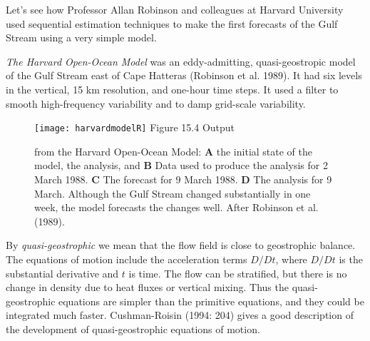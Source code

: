 Let's see how Professor Allan Robinson and colleagues at Harvard
University used sequential estimation techniques to make the first forecasts of the Gulf
Stream using a very simple model.

\textit{The Harvard Open-Ocean Model} was an eddy-admitting,
quasi-geostrop\-ic mod\-el of the Gulf Stream east of Cape Hatteras (Robinson et al. 1989). It
had six levels in the vertical, 15 km resolution, and one-hour time
steps. It used a filter to smooth high-frequency variability and to
damp grid-scale variability.

\begin{figure}[t!]
\texttt{[image: harvardmodelR]}
\footnotesize
Figure 15.4 Output \rule{0mm}{4ex} from the Harvard Open-Ocean Model:
\textbf{A} the initial state of the model, the analysis, and
\textbf{B} Data used to produce the analysis for 2 March
1988. \textbf{C} The forecast for 9 March 1988. \textbf{D} The
analysis for 9 March. Although the Gulf Stream changed substantially in one week, the model
forecasts the changes well. After Robinson et al. (1989).
\label{fig:harvardmodel}
\vspace{-3ex}
\end{figure}

By \textit{quasi-geostrophic} we mean
that the flow field is close to geostrophic balance. The equations of
motion include the acceleration terms $D/Dt$, where $D/Dt$ is the
substantial derivative and $t$ is time. The flow can be stratified,
but there is no change in density due to heat fluxes
or vertical mixing. Thus the quasi-geostrophic equations are
simpler than the primitive equations, and they could be integrated
much faster. Cushman-Roisin (1994: 204) gives a good description of
the development of quasi-geostrophic equations of motion.

